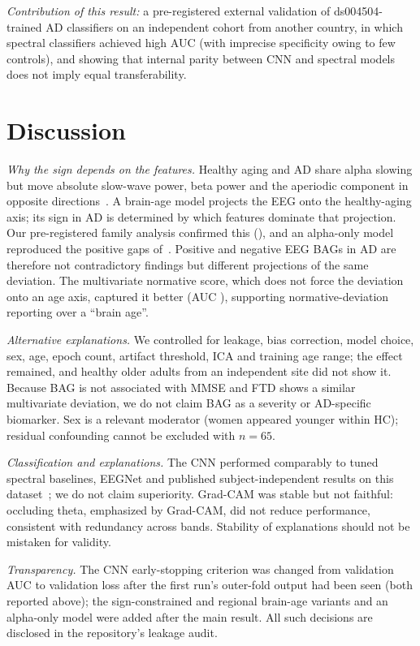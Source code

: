 \documentclass[journal]{IEEEtran}
\begin{document}
\emph{Contribution of this result:} a pre-registered external validation of ds004504-trained AD classifiers on an independent cohort from another country, in which spectral classifiers achieved high AUC (with imprecise specificity owing to few controls), and showing that internal parity between CNN and spectral models does not imply equal transferability.

\section{Discussion}
\label{sec:disc}
\emph{Why the sign depends on the features.} Healthy aging and AD share alpha slowing but move absolute slow-wave power, beta power and the aperiodic component in opposite directions~\cite{babiloni2020}. A brain-age model projects the EEG onto the healthy-aging axis; its sign in AD is determined by which features dominate that projection. Our pre-registered family analysis confirmed this (\famAgree{}), and an alpha-only model reproduced the positive gaps of~\cite{otero2026}. Positive and negative EEG BAGs in AD are therefore not contradictory findings but different projections of the same deviation. The multivariate normative score, which does not force the deviation onto an age axis, captured it better (AUC \normAUC{}), supporting normative-deviation reporting over a ``brain age''.

\emph{Alternative explanations.} We controlled for leakage, bias correction, model choice, sex, age, epoch count, artifact threshold, ICA and training age range; the effect remained, and healthy older adults from an independent site did not show it. Because BAG is not associated with MMSE and FTD shows a similar multivariate deviation, we do not claim BAG as a severity or AD-specific biomarker. Sex is a relevant moderator (women appeared younger within HC); residual confounding cannot be excluded with $n=65$.

\emph{Classification and explanations.} The CNN performed comparably to tuned spectral baselines, EEGNet and published subject-independent results on this dataset~\cite{miltiadous2021,miltiadous2023dice}; we do not claim superiority. Grad-CAM was stable but not faithful: occluding theta, emphasized by Grad-CAM, did not reduce performance, consistent with redundancy across bands. Stability of explanations should not be mistaken for validity.

\emph{Transparency.} The CNN early-stopping criterion was changed from validation AUC to validation loss after the first run's outer-fold output had been seen (both reported above); the sign-constrained and regional brain-age variants and an alpha-only model were added after the main result. All such decisions are disclosed in the repository's leakage audit.
\end{document}
